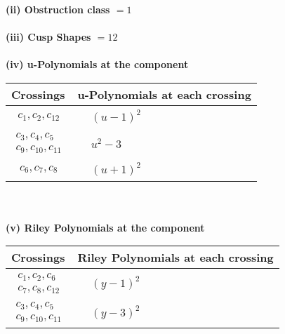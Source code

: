 \documentclass[1p]{elsarticle_modified}
\theoremstyle{definition}
\begin{document}
\flushleft \textbf{(ii) Obstruction class $= 1$}\\~\\
\flushleft \textbf{(iii) Cusp Shapes $= 12$}\\~\\
\newpage\renewcommand{\arraystretch}{1}
\flushleft \textbf{(iv) u-Polynomials at the component}\newline \\
\begin{tabular}{m{50pt}|m{274pt}}
Crossings & \hspace{64pt}u-Polynomials at each crossing \\
\hline $$\begin{aligned}c_{1},c_{2},c_{12}\end{aligned}$$&$\begin{aligned}
&(u-1)^2
\end{aligned}$\\
\hline $$\begin{aligned}c_{3},c_{4},c_{5}\\c_{9},c_{10},c_{11}\end{aligned}$$&$\begin{aligned}
&u^2-3
\end{aligned}$\\
\hline $$\begin{aligned}c_{6},c_{7},c_{8}\end{aligned}$$&$\begin{aligned}
&(u+1)^2
\end{aligned}$\\
\hline
\end{tabular}\\~\\
\newpage\renewcommand{\arraystretch}{1}
\flushleft \textbf{(v) Riley Polynomials at the component}\newline \\
\begin{tabular}{m{50pt}|m{274pt}}
Crossings & \hspace{64pt}Riley Polynomials at each crossing \\
\hline $$\begin{aligned}c_{1},c_{2},c_{6}\\c_{7},c_{8},c_{12}\end{aligned}$$&$\begin{aligned}
&(y-1)^2
\end{aligned}$\\
\hline $$\begin{aligned}c_{3},c_{4},c_{5}\\c_{9},c_{10},c_{11}\end{aligned}$$&$\begin{aligned}
&(y-3)^2
\end{aligned}$\\
\hline
\end{tabular}\\~\\
\end{document}
